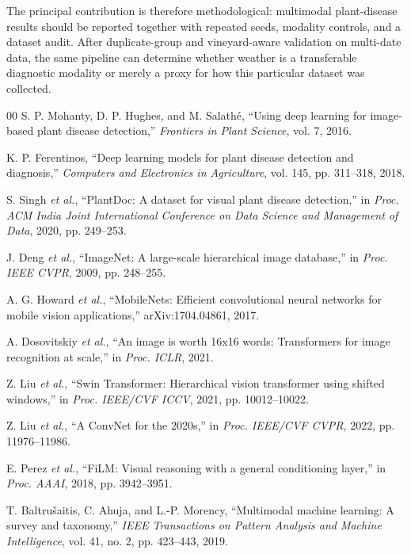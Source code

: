 \documentclass[conference]{IEEEtran}
\begin{document}
The principal contribution is therefore methodological: multimodal plant-disease results should be reported together with repeated seeds, modality controls, and a dataset audit. After duplicate-group and vineyard-aware validation on multi-date data, the same pipeline can determine whether weather is a transferable diagnostic modality or merely a proxy for how this particular dataset was collected.

\begin{thebibliography}{00}
S. P. Mohanty, D. P. Hughes, and M. Salathé, ``Using deep learning for image-based plant disease detection,'' \textit{Frontiers in Plant Science}, vol. 7, 2016.

K. P. Ferentinos, ``Deep learning models for plant disease detection and diagnosis,'' \textit{Computers and Electronics in Agriculture}, vol. 145, pp. 311--318, 2018.

S. Singh \textit{et al.}, ``PlantDoc: A dataset for visual plant disease detection,'' in \textit{Proc. ACM India Joint International Conference on Data Science and Management of Data}, 2020, pp. 249--253.

J. Deng \textit{et al.}, ``ImageNet: A large-scale hierarchical image database,'' in \textit{Proc. IEEE CVPR}, 2009, pp. 248--255.

A. G. Howard \textit{et al.}, ``MobileNets: Efficient convolutional neural networks for mobile vision applications,'' arXiv:1704.04861, 2017.

A. Dosovitskiy \textit{et al.}, ``An image is worth 16x16 words: Transformers for image recognition at scale,'' in \textit{Proc. ICLR}, 2021.

Z. Liu \textit{et al.}, ``Swin Transformer: Hierarchical vision transformer using shifted windows,'' in \textit{Proc. IEEE/CVF ICCV}, 2021, pp. 10012--10022.

Z. Liu \textit{et al.}, ``A ConvNet for the 2020s,'' in \textit{Proc. IEEE/CVF CVPR}, 2022, pp. 11976--11986.

E. Perez \textit{et al.}, ``FiLM: Visual reasoning with a general conditioning layer,'' in \textit{Proc. AAAI}, 2018, pp. 3942--3951.

T. Baltrušaitis, C. Ahuja, and L.-P. Morency, ``Multimodal machine learning: A survey and taxonomy,'' \textit{IEEE Transactions on Pattern Analysis and Machine Intelligence}, vol. 41, no. 2, pp. 423--443, 2019.


\end{thebibliography}
\end{document}
